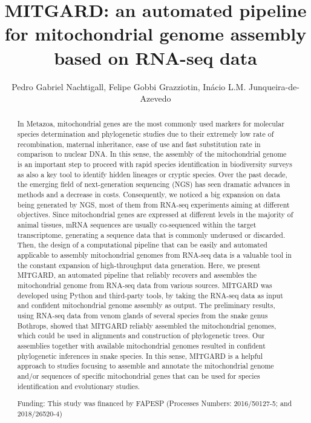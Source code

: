 \documentclass[twoside]{article}
\title{\vspace{-15mm}\fontsize{24pt}{10pt}\selectfont\textbf{ MITGARD: an automated pipeline for mitochondrial genome assembly based on RNA-seq data }} %
\author{ Pedro Gabriel Nachtigall, Felipe Gobbi Grazziotin, In\'acio L.M. Junqueira-de-Azevedo }
\affil{ Laborat\'orio Especial de Toxinologia Aplicada (LETA),  Instituto Butantan,  S\~ao Paulo,  Brazil }
\date{}
\begin{document}
  
  
  \maketitle %
  
  
  \thispagestyle{fancy} %
  
  
  \begin{abstract}
  In Metazoa,  mitochondrial genes are the most commonly used markers for molecular species determination and phylogenetic studies due to their extremely low rate of recombination,  maternal inheritance,  ease of use and fast substitution rate in comparison to nuclear DNA. In this sense,  the assembly of the mitochondrial genome is an important step to proceed with rapid species identification in biodiversity surveys as also a key tool to identify hidden lineages or cryptic species. Over the past decade,  the emerging field of next-generation sequencing (NGS) has seen dramatic advances in methods and a decrease in costs. Consequently,  we noticed a big expansion on data being generated by NGS,  most of them from RNA-seq experiments aiming at different objectives. Since mitochondrial genes are expressed at different levels in the majority of animal tissues,  mRNA sequences are usually co-sequenced within the target transcriptome,  generating a sequence data that is commonly underused or discarded. Then,  the design of a computational pipeline that can be easily and automated applicable to assembly mitochondrial genomes from RNA-seq data is a valuable tool in the constant expansion of high-throughput data generation. Here,  we present MITGARD,  an automated pipeline that reliably recovers and assembles the mitochondrial genome from RNA-seq data from various sources. MITGARD was developed using Python and third-party tools,  by taking the RNA-seq data as input and confident mitochondrial genome assembly as output. The preliminary results,  using RNA-seq data from venom glands of several species from the snake genus Bothrops,  showed that MITGARD reliably assembled the mitochondrial genomes,  which could be used in alignments and construction of phylogenetic trees. Our assemblies together with available mitochondrial genomes resulted in confident phylogenetic inferences in snake species. In this sense,  MITGARD is a helpful approach to studies focusing to assemble and annotate the mitochondrial genome and/or sequences of specific mitochondrial genes that can be used for species identification and evolutionary studies.
  
  Funding: This study was financed by FAPESP (Processes Numbers: 2016/50127-5; and 2018/26520-4) \\ 
  \end{abstract}
  
\end{document}
